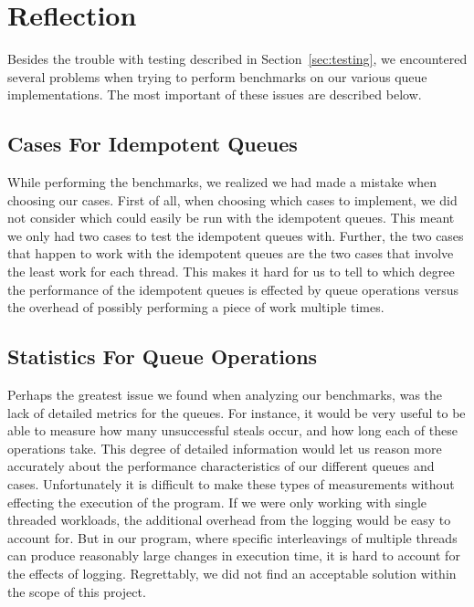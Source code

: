 \section{Reflection}
\label{sec:Reflection}
Besides the trouble with testing described in Section~\ref{sec:testing}, we
encountered several problems when trying to perform benchmarks on our various
queue implementations. The most important of these issues are described below.
 
\subsection{Cases For Idempotent Queues}
\label{sub:cases_for_idempotent_queues}
While performing the benchmarks, we realized we had made a mistake when
choosing our cases. First of all, when choosing which cases to implement, we
did not consider which could easily be run with the idempotent queues. This
meant we only had two cases to test the idempotent queues with. Further, the
two cases that happen to work with the idempotent queues are the two cases
that involve the least work for each thread. This makes it hard for us to tell
to which degree the performance of the idempotent queues is effected by queue
operations versus the overhead of possibly performing a piece of work multiple
times.

\subsection{Statistics For Queue Operations}
\label{sub:statistic_for_queue_operations}
Perhaps the greatest issue we found when analyzing our benchmarks, was the lack
of detailed metrics for the queues. For instance, it would be very useful to be
able to measure how many unsuccessful steals occur, and how long each of these
operations take. This degree of detailed information would let us reason more
accurately about the performance characteristics of our different queues and
cases. Unfortunately it is difficult to make these types of measurements
without effecting the execution of the program. If we were only working with
single threaded workloads, the additional overhead from the logging would be
easy to account for. But in our program, where specific interleavings of
multiple threads can produce reasonably large changes in execution time, it is
hard to account for the effects of logging. Regrettably, we did not find an
acceptable solution within the scope of this project.

